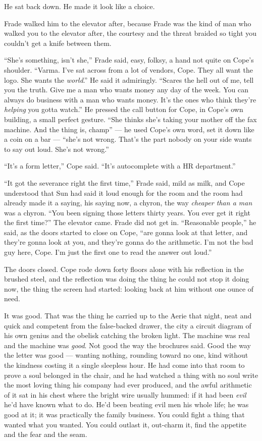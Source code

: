 \documentclass[11pt,openany]{book}
\newcommand{\scenebreak}{\par\vspace{0.5\baselineskip}\begin{center}\textasteriskcentered\quad\textasteriskcentered\quad\textasteriskcentered\end{center}\vspace{0.5\baselineskip}\par}
\begin{document}
He sat back down. He made it look like a choice.


\scenebreak


Frade walked him to the elevator after, because Frade was the kind of man who walked you to the elevator after, the courtesy and the threat braided so tight you couldn't get a knife between them.

``She's something, isn't she,'' Frade said, easy, folksy, a hand not quite on Cope's shoulder. ``Varma. I've sat across from a lot of vendors, Cope. They all want the logo. She wants the \textit{world}.'' He said it admiringly. ``Scares the hell out of me, tell you the truth. Give me a man who wants money any day of the week. You can always do business with a man who wants money. It's the ones who think they're \textit{helping} you gotta watch.'' He pressed the call button for Cope, in Cope's own building, a small perfect gesture. ``She thinks she's taking your mother off the fax machine. And the thing is, champ'' --- he used Cope's own word, set it down like a coin on a bar --- ``she's not wrong. That's the part nobody on your side wants to say out loud. She's not wrong.''

``It's a form letter,'' Cope said. ``It's autocomplete with a HR department.''

``It got the severance right the first time,'' Frade said, mild as milk, and Cope understood that Sun had said it loud enough for the room and the room had already made it a saying, his saying now, a chyron, the way \textit{cheaper than a man} was a chyron. ``You been signing those letters thirty years. You ever get it right the first time?'' The elevator came. Frade did not get in. ``Reasonable people,'' he said, as the doors started to close on Cope, ``are gonna look at that letter, and they're gonna look at you, and they're gonna do the arithmetic. I'm not the bad guy here, Cope. I'm just the first one to read the answer out loud.''

The doors closed. Cope rode down forty floors alone with his reflection in the brushed steel, and the reflection was doing the thing he could not stop it doing now, the thing the screen had started: looking back at him without one ounce of need.

It was good. That was the thing he carried up to the Aerie that night, neat and quick and competent from the false-backed drawer, the city a circuit diagram of his own genius and the obelisk catching the broken light. The machine was real and the machine was \textit{good}. Not good the way the brochures said. Good the way the letter was good --- wanting nothing, rounding toward no one, kind without the kindness costing it a single sleepless hour. He had come into that room to prove a soul belonged in the chair, and he had watched a thing with no soul write the most loving thing his company had ever produced, and the awful arithmetic of it sat in his chest where the bright wire usually hummed: if it had been \textit{evil} he'd have known what to do. He'd been beating evil men his whole life; he was good at it; it was practically the family business. You could fight a thing that wanted what you wanted. You could outlast it, out-charm it, find the appetite and the fear and the seam.
\end{document}
